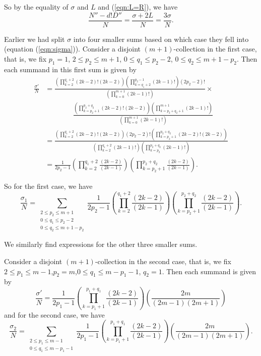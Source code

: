 \documentclass[11pt]{article}
\theoremstyle{mythm}
\begin{document}
So by the equality of $\sigma$ and $L$ and (\ref{eqn:L=R}), we have
\begin{equation*}
\frac{N''-d!D''}{N} = \frac{\sigma + 2L}{N} = \frac{3\sigma}{N}.
\end{equation*}

Earlier we had split $\sigma$ into four smaller sums based on which case they fell into (equation (\ref{eqn:sigma})). Consider a disjoint $(m+1)$-collection in the first case, that is, we fix $p_1 = 1$, $2\leq p_2\leq m+1$, $0\leq q_1\leq p_2 - 2$, $0\leq q_2 \leq m+1-p_2$. Then each summand in this first sum is given by
\begin{align*}
\frac{\sigma'}{N} &= \frac{\left(\prod\limits_{k=2}^{q_1+2}(2k-2)!(2k-2)\right)\left(\prod\limits_{k=q_1+2}^{p_2-1}(2k-1)!\right)(2p_2-2)!}{\left(\prod\limits_{k=0}^{m+1}(2k-1)!\right)}\times \\
&\qquad\qquad\frac{\left(\prod\limits_{k=p_2+1}^{p_2+q_2}(2k-2)!(2k-2)\right)\left(\prod\limits_{k=p_2+q_2+1}^{m+1}(2k-1)!\right)}{\left(\prod\limits_{k=0}^{m+1}(2k-1)!\right)} \\
&= \frac{\left(\prod\limits_{k=2}^{q_1+2}(2k-2)!(2k-2)\right)(2p_2-2)!\left(\prod\limits_{k=p_2+1}^{p_2+q_2}(2k-2)!(2k-2)\right)}{\left(\prod\limits_{k=2}^{q_1+2}(2k-1)!\right)\left(\prod\limits_{k=p_2}^{p_2+q_2}(2k-1)!\right)} \\
&= \frac{1}{2p_2-1}\left(\prod\limits_{k=2}^{q_1+2}\frac{(2k-2)}{(2k-1)}\right)\left(\prod\limits_{k=p_2+1}^{p_2+q_2}\frac{(2k-2)}{(2k-1)}\right).
\end{align*}

So for the first case, we have
\begin{equation}\label{eqn:sigma1}
\frac{\sigma_1}{N} = \sum\limits_{\substack{2\leq p_2\leq m+1 \\ 0\leq q_1 \leq p_2-2 \\ 0\leq q_2 \leq m+1-p_2}}\frac{1}{2p_2-1}\left(\prod\limits_{k=2}^{q_1+2}\frac{(2k-2)}{(2k-1)}\right)\left(\prod\limits_{k=p_2+1}^{p_2+q_2}\frac{(2k-2)}{(2k-1)}\right).
\end{equation}

We similarly find expressions for the other three smaller sums.

Consider a disjoint $(m+1)$-collection in the second case, that is, we fix $2\leq p_1\leq m-1$,$p_2=m$,$0\leq q_1\leq m-p_1-1$, $q_2 = 1$. Then each summand is given by
\begin{equation*}
\frac{\sigma'}{N} = \frac{1}{2p_1-1}\left(\prod\limits_{k=p_1+1}^{p_1+q_1}\frac{(2k-2)}{(2k-1)}\right)\left(\frac{2m}{(2m-1)(2m+1)}\right)
\end{equation*}
and for the second case, we have
\begin{equation}\label{eqn:sigma2}
\frac{\sigma_2}{N} = \sum\limits_{\substack{2\leq p_1\leq m-1 \\ 0\leq q_1\leq m-p_1-1}}\frac{1}{2p_1-1}\left(\prod\limits_{k=p_1+1}^{p_1+q_1}\frac{(2k-2)}{(2k-1)}\right)\left(\frac{2m}{(2m-1)(2m+1)}\right).
\end{equation}
\end{document}

